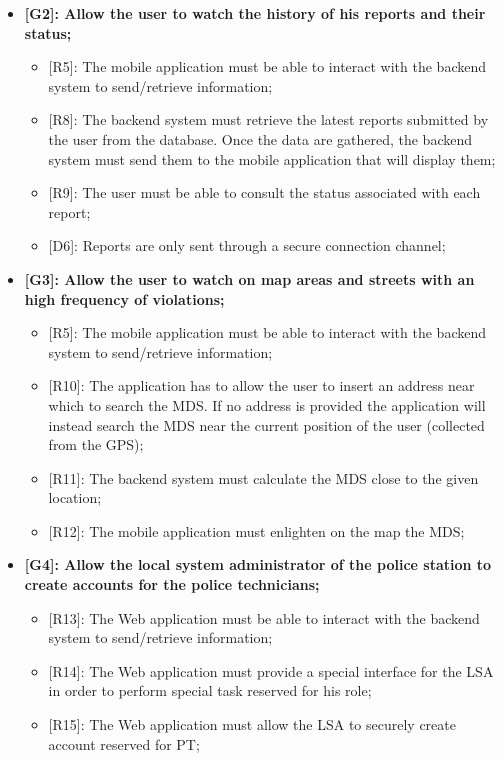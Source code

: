 \begin{itemize}
\begin{itemize}
    \end{itemize}
  \item \textbf{{[G2]}: Allow the user to watch the history of his reports and their status;}
    \begin{itemize}
      \item {[R5]}: The mobile application must be able to interact with the backend system to send/retrieve information;
      \item {[R8]}: The backend system must retrieve the latest reports submitted by the user from the database. Once the data are gathered, the backend system must send them to the mobile application that will display them;
      \item {[R9]}: The user must be able to consult the status associated with each report;
      \item {[D6]}: Reports are only sent through a secure connection channel;
    \end{itemize}
  \item \textbf{{[G3]}: Allow the user to watch on map areas and streets with an high frequency of violations;}
    \begin{itemize}
      \item {[R5]}: The mobile application must be able to interact with the backend system to send/retrieve information;
      \item {[R10]}: The application has to allow the user to insert an address near which to search the MDS. If no address is provided the application will instead search the MDS near the current position of the user (collected from the GPS);
      \item {[R11]}: The backend system must calculate the MDS close to the given location;
      \item {[R12]}: The mobile application must enlighten on the map the MDS;
    \end{itemize}
  \item \textbf{{[G4]}: Allow the local system administrator of the police station to create accounts for the police technicians;}
    \begin{itemize}
      \item {[R13]}: The Web application must be able to interact with the backend system to send/retrieve information;
      \item {[R14]}: The Web application must provide a special interface for the LSA in order to perform special task reserved for his role;
      \item {[R15]}: The Web application must allow the LSA to securely create account reserved for PT;

\end{itemize}
\end{itemize}
